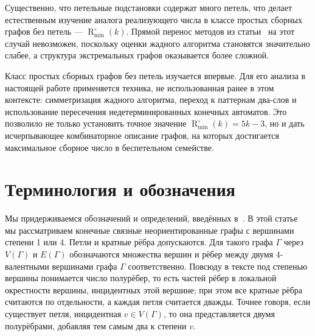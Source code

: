 \documentclass{article}
\theoremstyle{definition}
\newcommand{\Romin}{\operatorname{R}_{\min}^\circ}
\begin{document}
Существенно, что петельные подстановки содержат много петель, что делает естественным изучение аналога реализующего числа в классе простых сборных графов без петель — $\Romin(k)$. Прямой перенос методов из статьи~\cite{MaksaevPreprint} на этот случай невозможен, поскольку оценки жадного алгоритма становятся значительно слабее, а структура экстремальных графов оказывается более сложной.

Класс простых сборных графов без петель изучается впервые. Для его анализа в настоящей работе применяется техника, не использованная ранее в этом контексте: симметризация жадного алгоритма, переход к паттернам два-слов и использование пересечения недетерминированных конечных автоматов. Это позволило не только установить точное значение $\Romin(k)=5k-3$, но и дать исчерпывающее комбинаторное описание графов, на которых достигается максимальное сборное число в беспетельном семействе.

\section{Терминология и обозначения}\label{sec:term}

Мы придерживаемся обозначений и определений, введённых в~\cite{Angeleska2009,Muche2012,MaksaevPreprint}. В этой статье мы рассматриваем конечные связные неориентированные графы с вершинами степени 1 или 4. Петли и кратные рёбра допускаются. Для такого графа $\Gamma$ через $V(\Gamma)$ и $E(\Gamma)$ обозначаются множества вершин и рёбер между двумя 4-валентными вершинами графа $\Gamma$ соответственно. Повсюду в тексте под степенью вершины понимается число полурёбер, то есть частей рёбер в локальной окрестности вершины, инцидентных этой вершине; при этом все кратные рёбра считаются по отдельности, а каждая петля считается дважды. Точнее говоря, если существует петля, инцидентная $v \in V(\Gamma)$, то она представляется двумя полурёбрами, добавляя тем самым два к степени $v$.
\end{document}

